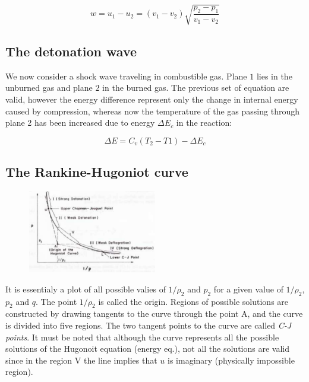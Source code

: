 \documentclass[12pt]{article}
\begin{document}
\begin{equation}
    w=u_{1}-u_{2}= (v_{1}-v_{2})\sqrt{\frac{p_{2}-p_{1}}{v_{1}-v_{2}}}
\end{equation}

\subsection{The detonation wave}

We now consider a shock wave traveling in combustible gas. Plane $1$ lies in the unburned gas and plane $2$ in the burned gas. The previous set of equation are valid, however the energy difference represent only the change in internal energy caused by compression, whereas now the temperature of the gas passing through plane 2 has been increased due to energy $\Delta E_{c}$ in the reaction:

\begin{equation}
    \Delta E = C_{v}(T_{2}-T{1}) - \Delta E_{c}
\end{equation}

\subsection{The Rankine-Hugoniot curve}

\begin{figure}[h!]
\centering
\includegraphics[width=0.5\textwidth]{figures/rankine.png}
\end{figure}

It is essentialy a plot of all possible valies of $1/\rho_{2}$ and $p_{2}$ for a given value of $1/\rho_{2}$, $p_{2}$ and $q$. The point $1/\rho_{2}$ is called the origin. Regions of possible solutions are constructed by drawing tangents to the curve through the point A, and the curve is divided into five regions. The two tangent points to the curve are called \textit{C-J points}. It must be noted that although the curve represents all the possible solutions of the Hugonoit equation (energy eq.), not all the solutions are valid since in the region V the line implies that $u$ is imaginary (physically impossible region).
\end{document}
